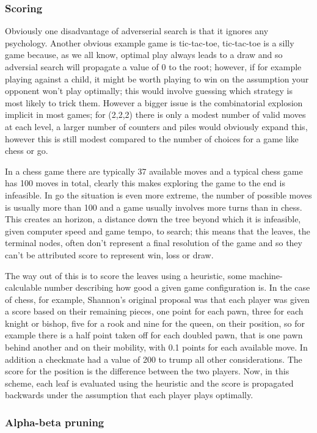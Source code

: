 \documentclass[11pt,a4paper]{scrartcl}
\begin{document}
\subsubsection*{Scoring}
Obviously one disadvantage of adverserial search is that it ignores
any psychology. Another obvious example game is tic-tac-toe,
tic-tac-toe is a silly game because, as we all know, optimal play
always leads to a draw and so adversial search will propagate a value
of 0 to the root; however, if for example playing against a child, it
might be worth playing to win on the assumption your opponent won't
play optimally; this would involve guessing which strategy is most
likely to trick them. However a bigger issue is the combinatorial
explosion implicit in most games; for (2,2,2) there is only a modest
number of valid moves at each level, a larger number of counters and
piles would obviously expand this, however this is still modest
compared to the number of choices for a game like chess or go.

In a chess game there are typically 37 available moves and a typical
chess game has 100 moves in total, clearly this makes exploring the
game to the end is infeasible. In go the situation is even more
extreme, the number of possible moves is usually more than 100 and a
game usually involves more turns than in chess. This creates an
horizon, a distance down the tree beyond which it is infeasible, given
computer speed and game tempo, to search; this means that the leaves,
the terminal nodes, often don't represent a final resolution of the
game and so they can't be attributed score to represent win, loss or
draw.

The way out of this is to score the leaves using a heuristic, some
machine-calculable number describing how good a given game
configuration is. In the case of chess, for example, Shannon's
original proposal was that each player was given a score based on
their remaining pieces, one point for each pawn, three for each knight
or bishop, five for a rook and nine for the queen, on their position,
so for example there is a half point taken off for each doubled pawn,
that is one pawn behind another and on their mobility, with 0.1 points
for each available move. In addition a checkmate had a value of 200 to
trump all other considerations. The score for the position is the
difference between the two players. Now, in this scheme, each leaf is
evaluated using the heuristic and the score is propagated backwards
under the assumption that each player plays optimally.

\subsubsection*{Alpha-beta pruning}
\end{document}
